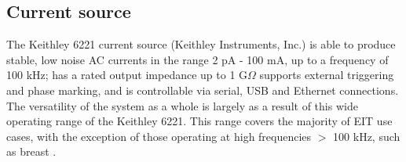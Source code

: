 \subsection{Current source}

The Keithley 6221 current source (Keithley Instruments, Inc.) is able to produce stable, low noise AC currents in the range 2 pA - 100 mA, up to a frequency of 100 kHz; has a rated output impedance up to 1 G$\Omega$ supports external triggering and phase marking, and is controllable via serial, USB and Ethernet connections. The versatility of the system as a whole is largely as a result of this wide operating range of the Keithley 6221. This range covers the majority of EIT use cases, with the exception of those operating at high frequencies $>$ 100 kHz, such as breast \cite{khan}. 